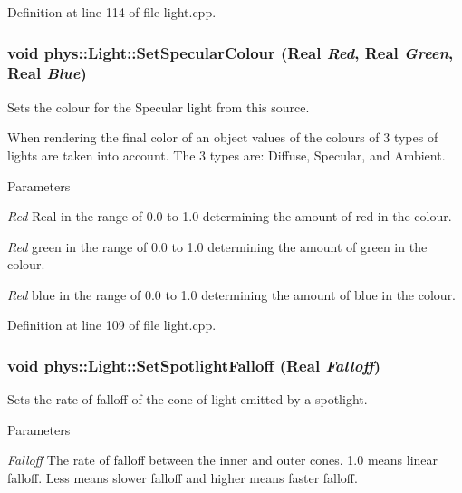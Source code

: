 Definition at line 114 of file light.cpp.

\hypertarget{classphys_1_1Light_a6f2f7b5745e455e7281f7c5e76766c1b}{
\subsubsection[{SetSpecularColour}]{\setlength{\rightskip}{0pt plus 5cm}void phys::Light::SetSpecularColour ({\bf Real} {\em Red}, \/  {\bf Real} {\em Green}, \/  {\bf Real} {\em Blue})}}
\label{dc/df1/classphys_1_1Light_a6f2f7b5745e455e7281f7c5e76766c1b}


Sets the colour for the Specular light from this source. 

When rendering the final color of an object values of the colours of 3 types of lights are taken into account. The 3 types are: Diffuse, Specular, and Ambient. 
\begin{DoxyParams}{Parameters}
\item[{\em Red}]Real in the range of 0.0 to 1.0 determining the amount of red in the colour. \item[{\em Red}]green in the range of 0.0 to 1.0 determining the amount of green in the colour. \item[{\em Red}]blue in the range of 0.0 to 1.0 determining the amount of blue in the colour. \end{DoxyParams}


Definition at line 109 of file light.cpp.

\hypertarget{classphys_1_1Light_a170e0fc23e3a50587a483fa8981b5486}{
\subsubsection[{SetSpotlightFalloff}]{\setlength{\rightskip}{0pt plus 5cm}void phys::Light::SetSpotlightFalloff ({\bf Real} {\em Falloff})}}
\label{dc/df1/classphys_1_1Light_a170e0fc23e3a50587a483fa8981b5486}


Sets the rate of falloff of the cone of light emitted by a spotlight. 


\begin{DoxyParams}{Parameters}
\item[{\em Falloff}]The rate of falloff between the inner and outer cones. 1.0 means linear falloff. Less means slower falloff and higher means faster falloff. \end{DoxyParams}


